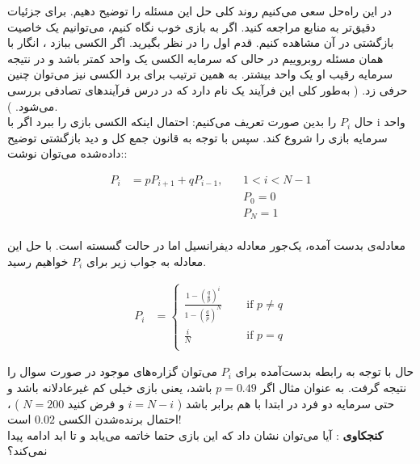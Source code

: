 در این راه‌حل سعی می‌کنیم روند کلی حل این مسئله را توضیح دهیم. برای جزئیات دقیق‌تر به منابع مراجعه کنید.
اگر به بازی خوب نگاه کنیم، می‌توانیم یک خاصیت بازگشتی در آن مشاهده کنیم. 
قدم اول را در نظر بگیرید. اگر الکسی ببازد ، انگار با همان مسئله روبروییم در حالی که سرمایه الکسی یک واحد کمتر باشد و در نتیجه سرمایه رقیب او یک واحد بیشتر. به همین ترتیب برای برد الکسی نیز می‌توان چنین حرفی زد.
(
به‌طور کلی این فرآیند یک 
نام دارد که در درس فرآیندهای تصادفی بررسی می‌شود.
).
\\
حال
$P_i$
را بدین صورت تعریف می‌کنیم: احتمال اینکه الکسی بازی را ببرد اگر با 
i
واحد سرمایه بازی را شروع کند.  
سپس با توجه به قانون جمع کل و دید بازگشتی توضیح داده‌شده می‌توان نوشت::

\begin{align*}
    P_i &= p P_{i+1} + q P_{i-1} \text{, } & &1 < i < N-1 \\
    & & & P_0 = 0 \\
    & & & P_N = 1 \\
\end{align*}

معادله‌ی بدست آمده، یک‌جور معادله دیفرانسیل اما در حالت گسسته است. با حل این معادله به جواب زیر برای 
$P_i$
خواهیم رسید.

\begin{align*}
    P_i &=
    \begin{cases}
            \frac{1-\left(\frac{q}{p}\right)^i}{1-\left(\frac{q}{p}\right)^N}  & \quad \text{ if } p \neq q \\
            \frac{i}{N}  & \quad \text{ if } p = q \\
        \end{cases}
\end{align*}

حال با توجه به رابطه بدست‌آمده برای 
$P_i$
می‌توان گزاره‌های موجود در صورت سوال را نتیجه گرفت. به عنوان مثال اگر 
$p = 0.49$
باشد، یعنی بازی خیلی کم غیرعادلانه باشد و حتی سرمایه دو فرد در ابتدا با هم برابر باشد
(
$i = N-i$
و
فرض کنید
$N=200$
)
،
احتمال برنده‌شدن الکسی 
$0.02$
است!
\\
\textbf{کنجکاوی}
:
آیا می‌توان نشان داد که این بازی حتما خاتمه می‌یابد و تا ابد ادامه پیدا نمی‌کند؟